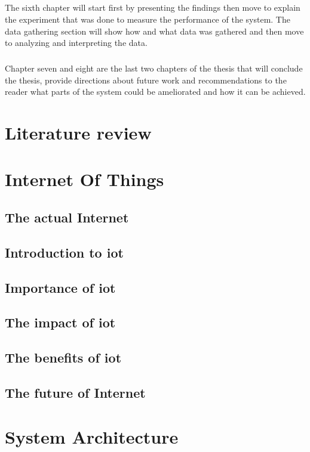 \documentclass[oneside,12pt,a4paper,final]{book}
\begin{document}
\paragraph{}
The sixth chapter will start first by presenting the findings then move to explain the experiment that was done to measure the performance of the system. The data gathering section will show how and what data was gathered and then move to analyzing and interpreting the data.
\paragraph{}
Chapter seven and eight are the last two chapters of the thesis that will conclude the thesis, provide directions about future work and recommendations to the reader what parts of the system could be ameliorated and how it can be achieved.
\chapter{Literature review}

\chapter{Internet Of Things}

\section{The actual Internet}
\section{Introduction to \gls{iot}}
\section{Importance of \gls{iot}}
\section{The impact of \gls{iot}}
\section{The benefits of \gls{iot}}
\section{The future of Internet}


\chapter{System Architecture}
\end{document}
